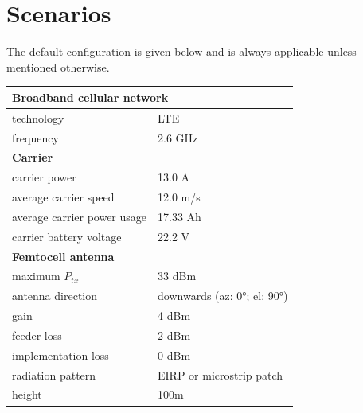 \documentclass[twocolumn]{phdsymp} %
\begin{document}
\section{Scenarios}
The default configuration is given below and is always applicable unless mentioned otherwise. 

\begin{table}[!htb]
\centering
\begin{tabular}[t]{ll}
        \toprule
        \multicolumn{2}{l}{\textbf{Broadband cellular network}} \\
        \hline
        \hspace{3mm}  technology        & LTE     \\
        \hspace{3mm}  frequency         & 2.6 GHz \\
        \hline
        \multicolumn{2}{l}{\textbf{Carrier}} \\
        \hline  
        \hspace{3mm}  carrier power        & 13.0 A   \\
        \hspace{3mm}  average carrier speed        & 12.0 m/s \\
        \hspace{3mm}  average carrier power usage      & 17.33 Ah    \\
        \hspace{3mm}  carrier battery voltage       & 22.2 V \\
        \hline
        \multicolumn{2}{l}{\textbf{Femtocell antenna}} \\
        \hline  
        \hspace{3mm}  maximum $P_{tx}$          & 33 dBm   \\
        \hspace{3mm}  antenna  direction        & downwards (az: \ang{0}; el: \ang{90})    \\ 
        \hspace{3mm}  gain                      & 4 dBm   \\ 
        \hspace{3mm}  feeder loss               & 2 dBm   \\ 
        \hspace{3mm}  implementation loss       & 0 dBm   \\
        \hspace{3mm}  radiation pattern         & EIRP or microstrip patch\\
        \hspace{3mm}  height                    & 100m  \\

\end{tabular}
\end{table}
\end{document}
